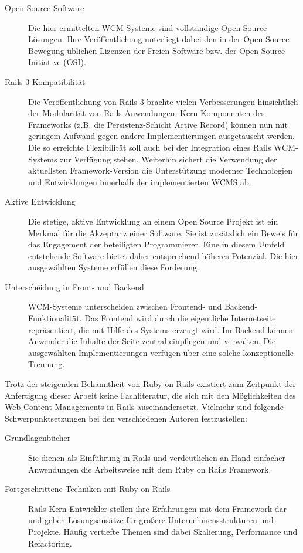 \begin{description}
\item[Open Source Software]
Die hier ermittelten WCM-Systeme sind vollständige Open Source Lösungen. Ihre Veröffentlichung unterliegt dabei den in der Open Source Bewegung üblichen Lizenzen der Freien Software bzw. der Open Source Initiative (OSI).
\item[Rails 3 Kompatibilität]
Die Veröffentlichung von Rails 3 brachte vielen Verbesserungen hinsichtlich der Modularität von Rails-Anwendungen. Kern-Komponenten des Frameworks (z.B. die Persistenz-Schicht Active Record) können nun mit geringem Aufwand gegen andere Implementierungen ausgetauscht werden. Die so erreichte Flexibilität soll auch bei der Integration eines Rails WCM-Systems zur Verfügung stehen.	Weiterhin sichert die Verwendung der aktuellsten Framework-Version die 	Unterstützung moderner Technologien und Entwicklungen innerhalb der implementierten WCMS ab.
\item[Aktive Entwicklung]
Die stetige, aktive Entwicklung an einem Open Source Projekt ist ein Merkmal für die Akzeptanz einer Software. Sie ist zusätzlich ein Beweis für das Engagement der beteiligten Programmierer. Eine in diesem Umfeld entstehende Software bietet daher entsprechend höheres Potenzial. Die  hier ausgewählten Systeme erfüllen diese Forderung.
\item[Unterscheidung in Front- und Backend]
WCM-Systeme unterscheiden zwischen Frontend- und Backend-Funktionalität. Das Frontend wird durch die eigentliche Internetseite repräsentiert, die mit Hilfe des Systems erzeugt wird. Im Backend können Anwender die Inhalte der Seite zentral einpflegen und verwalten.
Die ausgewählten Implementierungen verfügen über eine solche konzeptionelle Trennung.
\end{description}

Trotz der steigenden Bekanntheit von Ruby on Rails existiert zum Zeitpunkt der Anfertigung dieser Arbeit keine Fachliteratur, die sich mit den Möglichkeiten des Web Content Managements in Rails auseinandersetzt. Vielmehr sind folgende Schwerpunktsetzungen bei den verschiedenen Autoren festzustellen:
\begin{description}
\item[Grundlagenbücher]
Sie dienen als Einführung in Rails und verdeutlichen an Hand einfacher Anwendungen die Arbeitsweise mit dem Ruby on Rails Framework.
\item[Fortgeschrittene Techniken mit Ruby on Rails]
Rails Kern-Entwickler stellen ihre Erfahrungen mit dem Framework dar und geben Lösungsansätze für größere Unternehmensstrukturen und Projekte. Häufig vertiefte Themen sind dabei Skalierung, Performance und Refactoring.
\end{description}


